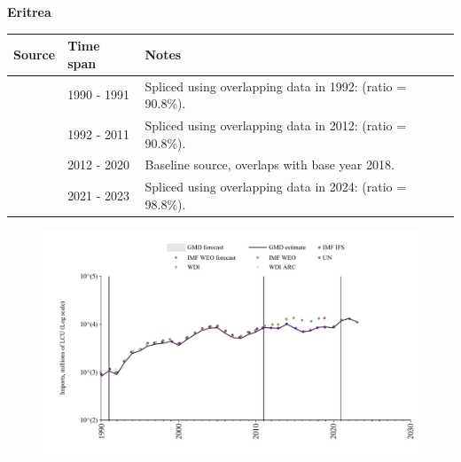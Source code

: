 \documentclass[12pt,a4paper,landscape]{article}
\begin{document}
\begin{adjustbox}{max totalsize={\paperwidth}{\paperheight},center}
\begin{minipage}[t][\textheight][t]{\textwidth}
\vspace*{0.5cm}
{}
\begin{center}
{\Large\bfseries Eritrea}
\end{center}
\vspace{0.5cm}
\begin{table}[H]
\centering
\small
\begin{tabular}{|l|l|l|}
\hline
\textbf{Source} & \textbf{Time span} & \textbf{Notes} \\
\hline
\rowcolor{white}\cite{UN}& 1990 - 1991 &Spliced using overlapping data in 1992: (ratio = 90.8\%).\\
\rowcolor{lightgray}\cite{WDI}& 1992 - 2011 &Spliced using overlapping data in 2012: (ratio = 90.8\%).\\
\rowcolor{white}\cite{UN}& 2012 - 2020 &Baseline source, overlaps with base year 2018.\\
\rowcolor{lightgray}\cite{IMF_IFS}& 2021 - 2023 &Spliced using overlapping data in 2024: (ratio = 98.8\%).\\
\hline
\end{tabular}
\end{table}
\begin{figure}[H]
\centering
\includegraphics[width=\textwidth,height=0.6\textheight,keepaspectratio]{graphs/ERI_imports.pdf}
\end{figure}
\end{minipage}
\end{adjustbox}
\end{document}
